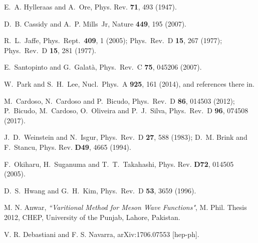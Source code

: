 \documentclass[twocolumn,showpacs,superscriptaddress,preprintnumbers,nofootinbib,prd]{revtex4-1}
\begin{document}
\begin{thebibliography}{}
E.~A. Hylleraas and A.~Ore, %
Phys. Rev. {\bf 71}, 493 (1947).

  D.~B. Cassidy and A.~P. Mills~Jr,
  Nature {\bf 449}, 195 (2007).

  R.~L.~Jaffe,
  Phys.\ Rept.\  {\bf 409}, 1 (2005);
  Phys.\ Rev.\ D {\bf 15}, 267 (1977);
  Phys.\ Rev.\ D {\bf 15}, 281 (1977).

  E.~Santopinto and G.~Galat\`a,
  Phys.\ Rev.\ C {\bf 75}, 045206 (2007).

  W.~Park and S.~H.~Lee,
  Nucl.\ Phys.\ A {\bf 925}, 161 (2014), and references there in.

  M.~Cardoso, N.~Cardoso and P.~Bicudo,
  Phys.\ Rev.\ D {\bf 86}, 014503 (2012);
  P.~Bicudo, M.~Cardoso, O.~Oliveira and P.~J.~Silva,
  Phys.\ Rev.\ D {\bf 96}, 074508 (2017).

  J.~D.~Weinstein and N.~Isgur,
  Phys.\ Rev.\ D {\bf 27}, 588 (1983);
  D.~M. Brink and F.~Stancu, %
  Phys. Rev. {\bf D49}, 4665 (1994).

  F.~Okiharu, H.~Suganuma and T.~T.~Takahashi,
  Phys. Rev. {\bf D72}, 014505 (2005).

  D.~S.~Hwang and G.~H.~Kim,
  Phys.\ Rev.\ D {\bf 53}, 3659 (1996).

M. N. Anwar, \textit{``Varitional Method for Meson Wave Functions"}, M. Phil. Thesis 2012,
CHEP, University of the Punjab, Lahore, Pakistan.

 V. R. Debastiani and F. S. Navarra,
  arXiv:1706.07553 [hep-ph].


\end{thebibliography}
\end{document}
